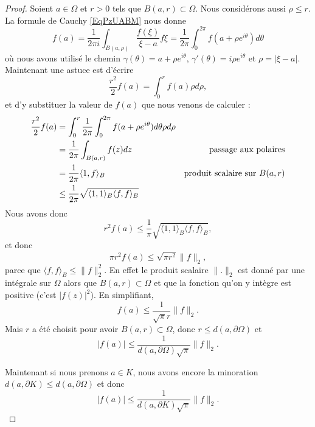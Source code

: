 \begin{proof}
    Soient \( a\in \Omega\) et \( r>0\) tels que \( B(a,r)\subset\Omega\). Nous considérons aussi \( \rho\leq r\). La formule de Cauchy \eqref{EqPzUABM} nous donne   
    \begin{equation}
        f(a)=\frac{1}{ 2\pi i }\int_{B(a,\rho)}\frac{ f(\xi) }{ \xi-a }f\xi=\frac{1}{ 2\pi }\int_0^{2\pi}f(a+\rho e^{i\theta})d\theta
    \end{equation}
    où nous avons utilisé le chemin \( \gamma(\theta)=a+\rho e^{i\theta}\), \( \gamma'(\theta)=i\rho e^{i\theta}\) et \( \rho=| \xi-a |\). Maintenant une astuce est d'écrire
    \begin{equation}
        \frac{ r^2 }{2}f(a)=\int_0^rf(a)\rho d\rho,
    \end{equation}
    et d'y substituer la valeur de \( f(a)\) que nous venons de calculer :
    \begin{subequations}
        \begin{align}
            \frac{ r^2 }{2}f(a)&=\int_0^r\frac{1}{ 2\pi }\int_0^{2\pi}f(a+\rho e^{i\theta})d\theta\rho d\rho\\
            &=\frac{1}{ 2\pi }\int_{B(a,r)}f(z)dz   &   \text{passage aux polaires}\\
            &=\frac{1}{ 2\pi }\langle 1, f\rangle_B   &   \text{produit scalaire sur \( B(a,r)\)}\\
            &\leq\frac{1}{ 2\pi }\sqrt{\langle 1, 1\rangle_B\langle f, f\rangle_B }\\
        \end{align}
    \end{subequations}
    Nous avons donc
    \begin{equation}
        r^2f(a)\leq \frac{1}{ \pi }\sqrt{\langle 1, 1\rangle_B\langle f, f\rangle_B},
    \end{equation}
    et donc
    \begin{equation}
        \pi r^2 f(a)\leq \sqrt{\pi r^2}\| f \|_2,
    \end{equation}
    parce que \( \langle f, f\rangle_B\leq \| f \|_2^2\). En effet le produit scalaire \( \| . \|_2\) est donné par une intégrale sur \( \Omega\) alors que \( B(a,r)\subset \Omega\) et que la fonction qu'on y intègre est positive (c'est \( | f(z) |^2\)). En simplifiant,
    \begin{equation}
        f(a)\leq \frac{1}{ \sqrt{\pi}r }\| f \|_2.
    \end{equation}
    Mais \( r\) a été choisit pour avoir \( B(a,r)\subset\Omega\), donc \( r\leq d(a,\partial \Omega)\) et
    \begin{equation}
        | f(a) |\leq \frac{1}{ d(a,\partial\Omega)\sqrt{\pi} }\| f \|_2.
    \end{equation}
    
    Maintenant si nous prenons \( a\in K\), nous avons encore la minoration \( d(a,\partial K)\leq d(a,\partial \Omega)\) et donc
    \begin{equation}
        | f(a) |\leq\frac{1}{ d(a,\partial K)\sqrt{\pi} }\| f \|_2.
    \end{equation}

\end{proof}

